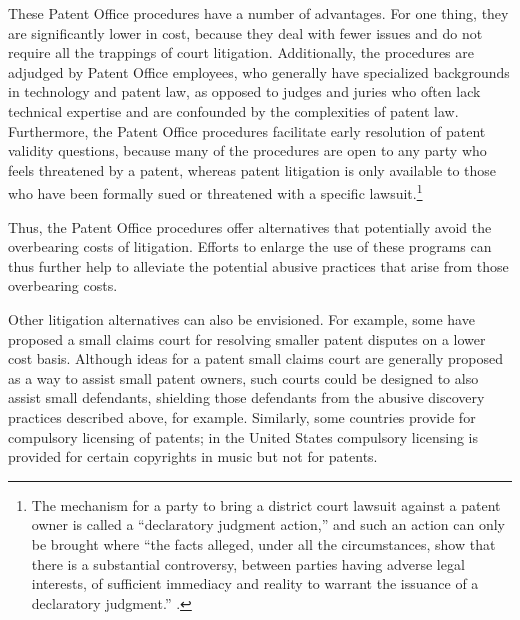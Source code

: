 \documentclass[11pt,twocolumn,titlepage]{article}
\begin{document}
These Patent Office procedures have a number of advantages. For one thing, they
are significantly lower in cost, because they deal with fewer issues and do not
require all the trappings of court litigation. Additionally, the procedures are
adjudged by Patent Office employees, who generally have specialized backgrounds
in technology and patent law, as opposed to judges and juries who often lack
technical expertise and are confounded by the complexities of patent
law.
Furthermore, the Patent Office procedures facilitate early resolution of patent
validity questions, because many of the procedures are open to any party who
feels threatened by a patent,
whereas patent litigation is only available to
those who have been formally sued or threatened with a specific
lawsuit.\footnote{The mechanism for a party to bring a district court lawsuit
against a patent owner is called a ``declaratory judgment action,'' and such an
action can only be brought where ``the facts alleged, under all the
circumstances, show that there is a substantial controversy, between parties
having adverse legal interests, of sufficient immediacy and reality to warrant
the issuance of a declaratory judgment.'' .}

Thus, the Patent Office procedures offer alternatives that potentially avoid the
overbearing costs of litigation. Efforts to enlarge the use of these programs
can thus further help to alleviate the potential abusive practices that arise
from those overbearing costs.

Other litigation alternatives can also be envisioned. For example, some have
proposed a small claims court for resolving smaller patent disputes on a lower
cost basis. Although ideas for a patent small claims
court are generally
proposed as a way to assist small patent owners, such courts could be designed
to also assist small defendants, shielding those defendants from the abusive
discovery practices described above, for example. Similarly, some countries
provide for compulsory licensing of patents; in the United States compulsory
licensing is provided for certain copyrights in music
but not for patents.
\end{document}
